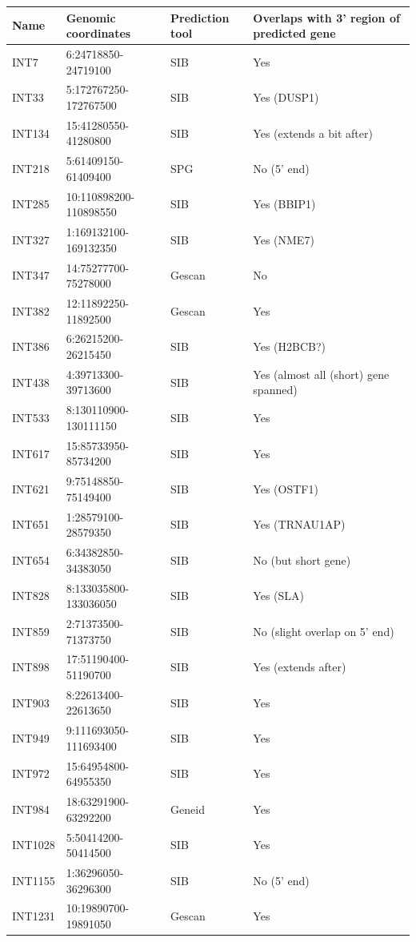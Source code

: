 \begin{table}[h]
    \small
    \centering
    \begin{tabular}{llll}
        \toprule
        Name & Genomic coordinates & Prediction tool & Overlaps with 3' region of predicted gene \\
        \midrule
	INT7 & 6:24718850-24719100 & SIB & Yes \\
	INT33 & 5:172767250-172767500 & SIB & Yes (DUSP1) \\
	INT134 & 15:41280550-41280800 & SIB & Yes (extends a bit after) \\
	INT218 & 5:61409150-61409400 & SPG & No (5' end) \\
	INT285 & 10:110898200-110898550 & SIB & Yes (BBIP1) \\
	INT327 & 1:169132100-169132350 & SIB & Yes (NME7) \\
	INT347 & 14:75277700-75278000 & Gescan & No \\
	INT382 & 12:11892250-11892500 & Gescan & Yes \\
	INT386 & 6:26215200-26215450 & SIB & Yes (H2BCB?) \\
	INT438 & 4:39713300-39713600 & SIB & Yes (almost all (short) gene spanned) \\
	INT533 & 8:130110900-130111150 & SIB & Yes \\
	INT617 & 15:85733950-85734200 & SIB & Yes \\
	INT621 & 9:75148850-75149400 & SIB & Yes (OSTF1) \\
	INT651 & 1:28579100-28579350 & SIB & Yes (TRNAU1AP) \\
	INT654 & 6:34382850-34383050 & SIB & No (but short gene)\\
	INT828 & 8:133035800-133036050 & SIB & Yes (SLA) \\
	INT859 & 2:71373500-71373750 & SIB & No (slight overlap on 5' end) \\
	INT898 & 17:51190400-51190700 & SIB & Yes (extends after)\\
	INT903 & 8:22613400-22613650 & SIB & Yes \\
	INT949 & 9:111693050-111693400 & SIB & Yes \\
	INT972 & 15:64954800-64955350 & SIB & Yes \\
	INT984 & 18:63291900-63292200 & Geneid & Yes \\
	INT1028 & 5:50414200-50414500 & SIB & Yes \\
	INT1155 & 1:36296050-36296300 & SIB & No (5' end) \\
	INT1231 & 10:19890700-19891050 & Gescan & Yes \\

\end{tabular}
\end{table}
